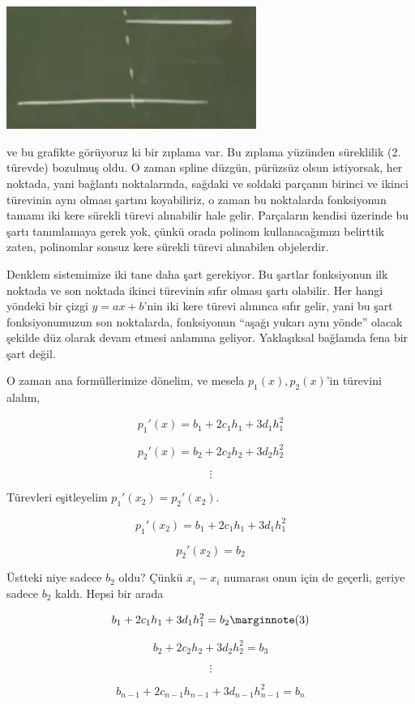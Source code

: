 \documentclass[12pt,fleqn]{article}\usepackage{../../common}
\begin{document}
\includegraphics[height=4cm]{spline8.png}

ve bu grafikte görüyoruz ki bir zıplama var. Bu zıplama yüzünden süreklilik
(2. türevde) bozulmuş oldu. O zaman spline düzgün, pürüzsüz olsun istiyorsak, her noktada, yani
bağlantı noktalarında, sağdaki ve soldaki parçanın birinci ve ikinci
türevinin aynı olması şartını koyabiliriz, o zaman bu noktalarda
fonksiyonun tamamı iki kere sürekli türevi alınabilir hale
gelir. Parçaların kendisi üzerinde bu şartı tanımlamaya gerek yok, çünkü
orada polinom kullanacağımızı belirttik zaten, polinomlar sonsuz kere
sürekli türevi alınabilen objelerdir. 

Denklem sistemimize iki tane daha şart gerekiyor. Bu şartlar fonksiyonun
ilk noktada ve son noktada ikinci türevinin sıfır olması şartı
olabilir. Her hangi yöndeki bir çizgi $y = ax + b$'nin iki kere türevi
alınınca sıfır gelir, yani bu şart fonksiyonumuzun son noktalarda,
fonksiyonun ``aşağı yukarı aynı yönde'' olacak şekilde düz olarak devam
etmesi anlamına geliyor. Yaklaşıksal bağlamda fena bir şart değil. 

O zaman ana formüllerimize dönelim, ve mesela $p_1(x),p_2(x)$'in türevini
alalım,

$$ p_1'(x) = b_1 + 2c_1h_1 + 3d_1h_1^2 $$

$$ p_2'(x) = b_2 + 2c_2h_2 + 3d_2h_2^2 $$

$$ \vdots $$

Türevleri eşitleyelim $p_1'(x_2) = p_2'(x_2)$. 

$$ p_1'(x_2) = b_1 + 2c_1h_1 + 3d_1h_1^2 $$

$$  p_2'(x_2) = b_2 $$

Üstteki niye sadece $b_2$ oldu? Çünkü $x_i-x_i$ numarası onun için de
geçerli, geriye sadece $b_2$ kaldı. Hepsi bir arada

$$  b_1 + 2c_1h_1 + 3d_1h_1^2  = b_2 
\mlabel{3}$$

$$  b_2 + 2c_2h_2 + 3d_2h_2^2 = b_3 $$

$$ \vdots $$

$$  b_{n-1} + 2c_{n-1}h_{n-1} + 3d_{n-1}h_{n-1}^2 =  b_n $$
\end{document}
